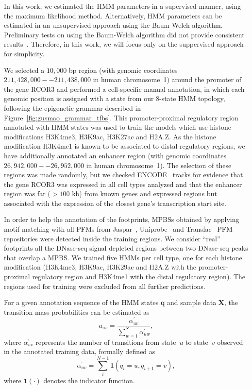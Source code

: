 In this work, we estimated the HMM parameters in a supervised manner, using the maximum likelihood method. Alternatively, HMM parameters can be estimated in an unsupervised approach using the Baum-Welch algorithm. Preliminary tests on using the Baum-Welch algorithm did not provide consistent results~\cite{gusmao2012}. Therefore, in this work, we will focus only on the suppervised approach for simplicity.

We selected a $10,000$ bp region (with genomic coordinates $211,428,000--211,438,000$ in human chromosome~1) around the promoter of the gene RCOR3 and performed a cell-specific manual annotation, in which each genomic position is assigned with a state from our $8$-state HMM topology, following the epigenetic grammar described in Figure~\ref{fig:gusmao_grammar_tfbs}. This promoter-proximal regulatory region annotated with HMM states was used to train the models which use histone modifications H3K4me3, H3K9ac, H3K27ac and H2A.Z. As the histone modification H3K4me1 is known to be associated to distal regulatory regions, we have additionally annotated an enhancer region (with genomic coordinates $26,942,000--26,952,000$ in human chromosome~1). The selection of these regions was made randomly, but we checked ENCODE~\cite{encode2012} tracks for evidence that the gene RCOR3 was expressed in all cell types analyzed and that the enhancer region was far ($>100$ kb) from known genes and expressed regions but associated with the expression of the closest gene's transcription start site.

In order to help the annotation of the footprints, MPBSs obtained by applying motif matching with all PFMs from Jaspar~\cite{mathelier2014}, Uniprobe~\cite{robasky2011} and Transfac~\cite{matys2006} PFM repositories were detected inside the training regions. We consider ``real'' footprints all the DNase-seq signal depleted regions between two DNase-seq peaks that overlap a MPBS. We trained five HMMs per cell type, one for each histone modification (H3K4me3, H3K9ac, H3K29ac and H2A.Z with the promoter-proximal regulatory region and H3K4me1 with the distal regulatory region). The regions used for training were excluded from all further predictions.

For a given annotation sequence of the HMM states $\mathbf{q}$ and sample data $\mathbf{X}$, the transition mass probabilities can be estimated as
\begin{equation}
  \label{eq:hmm.train.a.1}
  a_{uv} = \frac{ \alpha^{\prime}_{uv}}{ \sum_{w=1}^{S} \alpha^{\prime}_{uw}},
\end{equation}
where $ \alpha^{\prime}_{uv} $ represents the number of transitions from state~$u$ to state~$v$ observed in the annotated training data, formally defined as
\begin{equation}
  \label{eq:hmm.train.a.2}
  \alpha^{\prime}_{uv} = \sum_i^{N-1} \mathbf{1} (q_i=u,q_{i+1}=v),
\end{equation}
where $ {\mathbf{1}}(\cdot) $ denotes the indicator function.

